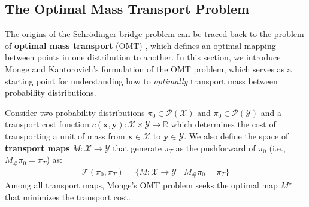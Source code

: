 \documentclass{article}
\newcommand{\boldtext}[1]{\textbf{\textcolor{MyGreen}{#1}}}
\begin{document}
\subsection{The Optimal Mass Transport Problem}
\label{subsec:optimal-mass-transport}
The origins of the Schrödinger bridge problem can be traced back to the problem of \boldtext{optimal mass transport} (OMT) \citep{villani2021topics}, which defines an optimal mapping between points in one distribution to another. In this section, we introduce Monge and Kantorovich's formulation of the OMT problem, which serves as a starting point for understanding how to \textit{optimally} transport mass between probability distributions. 

Consider two probability distributions $\pi_0\in \mathcal{P}(\mathcal{X})$ and $\pi_0\in \mathcal{P}(\mathcal{Y})$ and a transport cost function $c(\boldsymbol{x},\boldsymbol{y}): \mathcal{X}\times \mathcal{Y}\to\mathbb{R}$ which determines the cost of transporting a unit of mass from $\boldsymbol{x}\in \mathcal{X}$ to $\boldsymbol{y}\in \mathcal{Y}$. We also define the space of \boldtext{transport maps} $M: \mathcal{X}\to \mathcal{Y}$ that generate $\pi_T$ as the pushforward of $\pi_0$ (i.e., $M_{\#}\pi_0=\pi_T$) as: 
\begin{align}
    \mathcal{T}(\pi_0, \pi_T)=\{M: \mathcal{X}\to \mathcal{Y}\;|\;M_{\#}\pi_0=\pi_T\}
\end{align}
Among all transport maps, Monge's OMT problem seeks the optimal map $M^\star$ that minimizes the transport cost.
\end{document}
